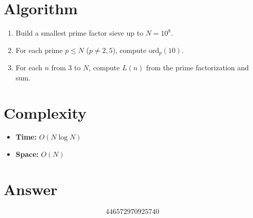 \documentclass[12pt]{article}
\theoremstyle{definition}
\begin{document}
\section{Algorithm}
\begin{enumerate}
    \item Build a smallest prime factor sieve up to $N = 10^8$.
    \item For each prime $p \leq N$ ($p \neq 2, 5$), compute $\mathrm{ord}_p(10)$.
    \item For each $n$ from 3 to $N$, compute $L(n)$ from the prime factorization and sum.
\end{enumerate}

\section{Complexity}
\begin{itemize}
    \item \textbf{Time:} $O(N \log N)$
    \item \textbf{Space:} $O(N)$
\end{itemize}

\section{Answer}

\[
\boxed{446572970925740}
\]
\end{document}
